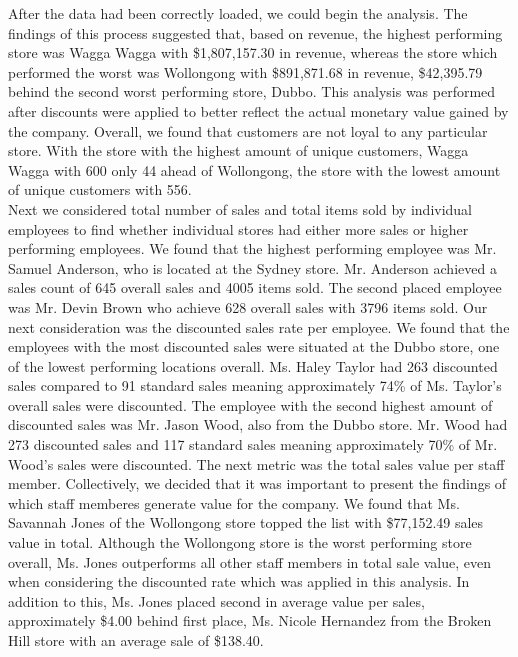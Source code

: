 \documentclass{article}
\begin{document}
    After the data had been correctly loaded, we could begin the analysis. The findings of this process suggested that, based on revenue, the highest performing store was Wagga Wagga with \$1,807,157.30 in revenue, whereas the store which performed the worst was Wollongong with \$891,871.68 in revenue, \$42,395.79 behind the second worst performing store, Dubbo. This analysis was performed after discounts were applied to better reflect the actual monetary value gained by the company. Overall, we found that customers are not loyal to any particular store. With the store with the highest amount of unique customers, Wagga Wagga with 600 only 44 ahead of Wollongong, the store with the lowest amount of unique customers with 556. \\
    
	Next we considered total number of sales and total items sold by individual employees to find whether individual stores had either more sales or higher performing employees. We found that the highest performing employee was Mr. Samuel Anderson, who is located at the Sydney store. Mr. Anderson achieved a sales count of 645 overall sales and 4005 items sold. The second placed employee was Mr. Devin Brown who achieve 628 overall sales with 3796 items sold. Our next consideration was the discounted sales rate per employee. We found that the employees with the most discounted sales were situated at the Dubbo store, one of the lowest performing locations overall. Ms. Haley Taylor had 263 discounted sales compared to 91 standard sales meaning approximately 74\% of Ms. Taylor's overall sales were discounted. The employee with the second highest amount of discounted sales was Mr. Jason Wood, also from the Dubbo store. Mr. Wood had 273 discounted sales and 117 standard sales meaning approximately 70\% of Mr. Wood's sales were discounted.  The next metric was the total sales value per staff member. Collectively, we decided that it was important to present the findings of which staff memberes generate value for the company. We found that Ms. Savannah Jones of the Wollongong store topped the list with \$77,152.49 sales value in total. Although the Wollongong store is the worst performing store overall, Ms. Jones outperforms all other staff members in total sale value, even when considering the discounted rate which was applied in this analysis. In addition to this, Ms. Jones placed second in average value per sales, approximately \$4.00 behind first place, Ms. Nicole Hernandez from the Broken Hill store with an average sale of \$138.40. 
	
\end{document}
